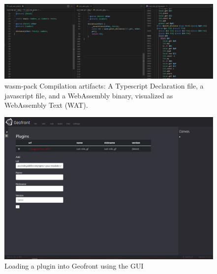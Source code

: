 \begin{figure}
  \centering
  \includegraphics[width=\linewidth]{13.PNG}
  \caption[compilation artifacts]{wasm-pack Compilation artifacts: A Typescript Declaration file, a javascript file, and a WebAssembly binary, visualized as WebAssembly Text (WAT). }
  \label{fig:rust-plugin:compilation-results}
\end{figure}

\begin{figure}
  \graphicspath{{../../assets/images/6.1.1/}}
  \centering
  \includegraphics[width=0.50\linewidth]{2.PNG}
  \caption[loading a plugin]{Loading a plugin into Geofront using the \ac{GUI}}
  \label{fig:min-rust-plugin-import}
\end{figure}

